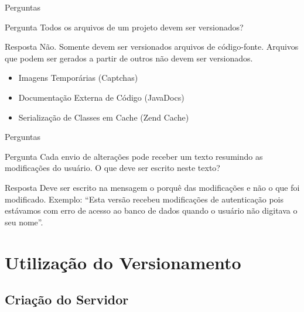 \documentclass[hyperref={pdfpagelabels=false}]{beamer}
\begin{document}
\begin{frame}{Perguntas}
    \begin{block}{Pergunta}
        Todos os arquivos de um projeto devem ser versionados?
    \end{block}
    \pause{}
    \begin{block}{Resposta}
        \alert{Não.} Somente devem ser versionados arquivos de código-fonte.
        Arquivos que podem ser gerados a partir de outros não devem ser
        versionados.
        \begin{itemize}
            \item Imagens Temporárias (Captchas)
            \item Documentação Externa de Código (JavaDocs)
            \item Serialização de Classes em Cache (Zend Cache)
        \end{itemize}
    \end{block}
\end{frame}

\begin{frame}{Perguntas}
    \begin{block}{Pergunta}
        Cada envio de alterações pode receber um texto resumindo as modificações
        do usuário. O que deve ser escrito neste texto?
    \end{block}
    \pause{}
    \begin{block}{Resposta}
        Deve ser escrito na mensagem o porquê das modificações e não o que foi
        modificado. \alert{Exemplo:} ``Esta versão recebeu modificações de
        autenticação pois estávamos com erro de acesso ao banco de dados quando
        o usuário não digitava o seu nome''.
    \end{block}
\end{frame}

\section{Utilização do Versionamento}
\label{sec:utilizacao}

\subsection{Criação do Servidor}
\end{document}
